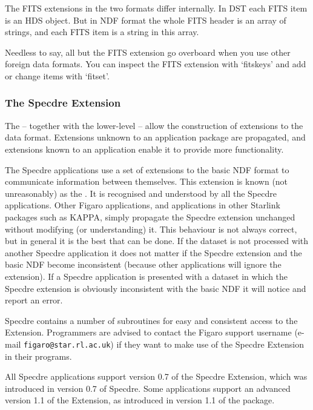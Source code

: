    The FITS extensions in the two formats differ internally. In DST each
   FITS item is an HDS object. But in NDF format the whole FITS header
   is an array of strings, and each FITS item is a string in this array.

   Needless to say, all but the FITS extension go overboard when
   you use other foreign data formats. You can inspect the FITS
   extension with `fitskeys' and add or change items with `fitset'.


\subsubsection{\label{specextens}The Specdre Extension}

   The
   -- together with the lower-level
   -- allow the construction of extensions to the data format.
   Extensions unknown to an application package are propagated, and
   extensions known to an application enable it to provide more
   functionality.

   The Specdre applications use a set of extensions to the basic NDF
   format to communicate information between themselves.  This
   extension is known (not unreasonably) as the .  It is recognised and understood by all the
   Specdre applications.  Other Figaro applications, and applications
   in other Starlink packages such as KAPPA, simply propagate the
   Specdre extension unchanged without modifying (or understanding) it.
   This behaviour is not always correct, but in general it is the best
   that can be done.  If the dataset is not processed with another
   Specdre application it does not matter if the Specdre extension and
   the basic NDF become inconsistent (because other applications will
   ignore the extension).  If a Specdre application is presented with
   a dataset in which the Specdre extension is obviously inconsistent
   with the basic NDF it will notice and report an error.

   Specdre contains a number of subroutines for easy and consistent
   access to the Extension. Programmers are advised to contact the
   Figaro support username (e-mail {\tt figaro@star.rl.ac.uk}) if they want
   to make use of the Specdre Extension in their programs.

   All Specdre applications support version 0.7 of the Specdre
   Extension, which was introduced in version 0.7 of Specdre. Some
   applications support an advanced version 1.1 of the Extension, as
   introduced in version 1.1 of the package.

